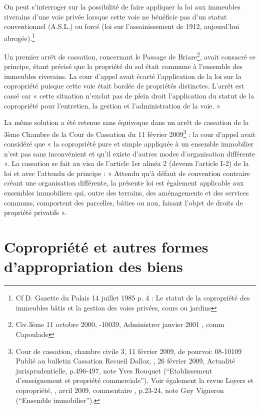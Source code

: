 			On peut s'interroger sur la possibilité de faire appliquer la loi aux immeubles riverains d'une voie privée
			lorsque cette voie ne bénéficie pas d'un statut conventionnel (A.S.L.) ou forcé (loi sur l'assainissement de
			1912, aujourd’hui abrogée).\footnote{
			Cf D.  Gazette du Palais 14 juillet 1985 p. 4 : Le statut de la copropriété des immeubles bâtis et la gestion des voies privées, cours ou jardins}
			
			Un premier arrêt de cassation, concernant le Passage de Briare\footnote{
			Civ.3ème 11 octobre 2000, -10039, Administrer janvier 2001 , comm Capoulade
			}, avait consacré ce principe, étant précisé que la propriété du sol était commune à l’ensemble des immeubles riverains. La cour d’appel avait écarté	l’application de la loi sur la copropriété puisque cette voie était bordée de propriétés distinctes. L’arrêt est cassé car « cette situation n’exclut pas de plein droit l’application du statut de la copropriété pour l’entretien, la gestion et l’administration de la voie. »
			
			La même solution a été retenue sans équivoque dans un arrêt de cassation de la 3ème Chambre de la Cour
			de Cassation du 11 février 2009\footnote{
			Cour de cassation, chambre civile 3, 11 février 2009, \no de pourvoi: 08-10109 Publié au bulletin Cassation Recueil Dalloz,
			, 26 février 2009, Actualité jurisprudentielle, p.496-497, note Yves Rouquet (“Etablissement d’enseignement et propriété
			commerciale”). Voir également la revue Loyers et copropriété, , avril 2009, commentaire , p.23-24, note Guy Vigneron
			(“Ensemble immobilier”).
			}	: la cour d’appel avait considéré que « la copropriété pure et simple
			appliquée à un ensemble immobilier n’est pas sans inconvénient et qu’il existe d’autres modes
			d’organisation différente ». La cassation se fait au visa de l’article 1er alinéa 2 (devenu l’article I-2\degre{}) de la
			loi et avec l’attendu de principe : « Attendu qu'à défaut de convention contraire créant une organisation
			différente, la présente loi est également applicable aux ensembles immobiliers qui, outre des terrains, des
			aménagements et des services communs, comportent des parcelles, bâties ou non, faisant l'objet de droits
			de propriété privatifs ».

\section{Copropriété et autres formes d’appropriation des biens}
	
